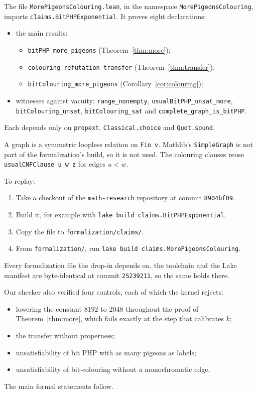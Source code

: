 \documentclass[11pt]{article}
\theoremstyle{remark}
\begin{document}
The file \texttt{MorePigeonsColouring.lean}, in the namespace
\texttt{MorePigeonsColouring}, imports \texttt{claims.BitPHPExponential}. It
proves eight declarations:
\begin{itemize}
\item the main results:
\begin{itemize}
\item \texttt{bitPHP\_more\_pigeons} (Theorem~\ref{thm:more});
\item \texttt{colouring\_refutation\_transfer} (Theorem~\ref{thm:transfer});
\item \texttt{bitColouring\_more\_pigeons} (Corollary~\ref{cor:colouring});
\end{itemize}
\item witnesses against vacuity: \texttt{range\_nonempty},
\texttt{usualBitPHP\_unsat\_more}, \texttt{bitColouring\_unsat},
\texttt{bitColouring\_sat} and \texttt{complete\_graph\_is\_bitPHP}.
\end{itemize}
Each depends only on \texttt{propext}, \texttt{Classical.choice} and
\texttt{Quot.sound}.

A graph is a symmetric loopless relation on \texttt{Fin v}. Mathlib's
\texttt{SimpleGraph} is not part of the formalization's build, so it is not
used. The colouring clauses reuse \texttt{usualCNFClause u w z} for edges
$u<w$.

To replay:
\begin{enumerate}
\item Take a checkout of the \texttt{math-research} repository at commit
\texttt{8904bf09}.
\item Build it, for example with \texttt{lake build claims.BitPHPExponential}.
\item Copy the file to \texttt{formalization/claims/}.
\item From \texttt{formalization/}, run \texttt{lake build
claims.MorePigeonsColouring}.
\end{enumerate}
Every formalization file the drop-in depends on, the toolchain and the Lake
manifest are byte-identical at commit \texttt{25239211}, so the same holds
there.

Our checker also verified four controls, each of which the kernel rejects:
\begin{itemize}
\item lowering the constant $8192$ to $2048$ throughout the proof of
Theorem~\ref{thm:more}, which fails exactly at the step that calibrates $k$;
\item the transfer without properness;
\item unsatisfiability of bit PHP with as many pigeons as labels;
\item unsatisfiability of bit-colouring without a monochromatic edge.
\end{itemize}
The main formal statements follow.
\par\endgroup
\end{document}
